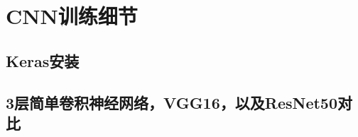 \chapter{CNN训练细节}
\label{section:train_details}

\section{Keras安装}

\section{3层简单卷积神经网络，VGG16，以及ResNet50对比}
\label{section:resnet_compare}
